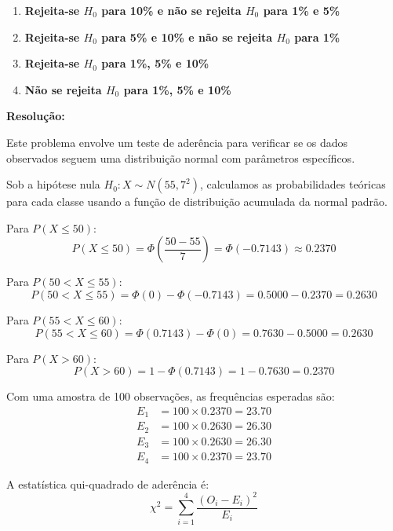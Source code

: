 \documentclass[a4paper,12pt]{article}
\begin{document}
\begin{enumerate}
    \vspace{0.3cm}

    \begin{enumerate}[label=\Alph*)]
        \item \textbf{Rejeita‑se \(H_0\) para 10\% e não se rejeita \(H_0\) para 1\% e 5\%}
        \item \textbf{Rejeita‑se \(H_0\) para 5\% e 10\% e não se rejeita \(H_0\) para 1\%}
        \item \textbf{Rejeita‑se \(H_0\) para 1\%, 5\% e 10\%}
        \item \textbf{Não se rejeita \(H_0\) para 1\%, 5\% e 10\%}
    \end{enumerate}

    \vspace{0.3cm}

    \begin{mdframed}[backgroundcolor=gray!10,linewidth=0pt,innertopmargin=10pt,innerbottommargin=10pt]
    \textbf{Resolução:}

    Este problema envolve um teste de aderência para verificar se os dados observados seguem uma distribuição normal com parâmetros específicos.

    Sob a hipótese nula $H_0: X \sim N(55, 7^2)$, calculamos as probabilidades teóricas para cada classe usando a função de distribuição acumulada da normal padrão.

    Para $P(X \leq 50)$:
    \[
    P(X \leq 50) = \Phi\left(\frac{50-55}{7}\right) = \Phi(-0.7143) \approx 0.2370
    \]

    Para $P(50 < X \leq 55)$:
    \[
    P(50 < X \leq 55) = \Phi(0) - \Phi(-0.7143) = 0.5000 - 0.2370 = 0.2630
    \]

    Para $P(55 < X \leq 60)$:
    \[
    P(55 < X \leq 60) = \Phi(0.7143) - \Phi(0) = 0.7630 - 0.5000 = 0.2630
    \]

    Para $P(X > 60)$:
    \[
    P(X > 60) = 1 - \Phi(0.7143) = 1 - 0.7630 = 0.2370
    \]

    Com uma amostra de 100 observações, as frequências esperadas são:
    \begin{align*}
    E_1 &= 100 \times 0.2370 = 23.70 \\
    E_2 &= 100 \times 0.2630 = 26.30 \\
    E_3 &= 100 \times 0.2630 = 26.30 \\
    E_4 &= 100 \times 0.2370 = 23.70
    \end{align*}

    A estatística qui-quadrado de aderência é:
    \[
    \chi^2 = \sum_{i=1}^4 \frac{(O_i - E_i)^2}{E_i}
    \]


\end{mdframed}
\end{enumerate}
\end{document}
